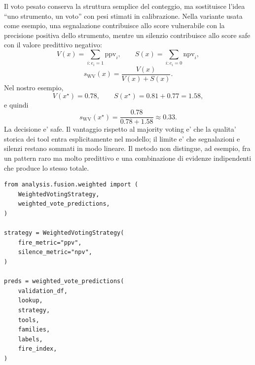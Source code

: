 Il voto pesato conserva la struttura semplice del conteggio, ma sostituisce l'idea ``uno strumento, un voto'' con pesi stimati in calibrazione. Nella variante usata come esempio, una segnalazione contribuisce allo score vulnerabile con la precisione positiva dello strumento, mentre un silenzio contribuisce allo score safe con il valore predittivo negativo:
\begin{equation}
V(x)=\sum_{i:e_i=1}\mathrm{ppv}_i,
\qquad
S(x)=\sum_{i:e_i=0}\mathrm{npv}_i,
\end{equation}
\begin{equation}
s_{\mathrm{WV}}(x)=\frac{V(x)}{V(x)+S(x)}.
\end{equation}
Nel nostro esempio,
\begin{equation}
V(x^\star)=0.78,
\qquad
S(x^\star)=0.81+0.77=1.58,
\end{equation}
e quindi
\begin{equation}
s_{\mathrm{WV}}(x^\star)=\frac{0.78}{0.78+1.58}\approx 0.33.
\end{equation}
La decisione e' safe. Il vantaggio rispetto al majority voting e' che la qualita' storica dei tool entra esplicitamente nel modello; il limite e' che segnalazioni e silenzi restano sommati in modo lineare. Il metodo non distingue, ad esempio, fra un pattern raro ma molto predittivo e una combinazione di evidenze indipendenti che produce lo stesso totale.

\begin{lstlisting}[caption={Implementazione weighted voting in analysis/fusion/weighted.py}]
from analysis.fusion.weighted import (
    WeightedVotingStrategy,
    weighted_vote_predictions,
)

strategy = WeightedVotingStrategy(
    fire_metric="ppv",
    silence_metric="npv",
)

preds = weighted_vote_predictions(
    validation_df,
    lookup,
    strategy,
    tools,
    families,
    labels,
    fire_index,
)
\end{lstlisting}
